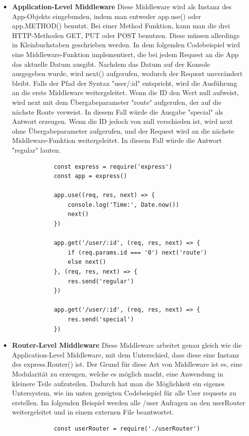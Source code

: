 \begin{itemize}
    \item \textbf{Application-Level Middleware}
        \newline
        Diese Middleware wird als Instanz des App-Objekts eingebunden, indem man entweder app.use() oder app.METHOD() benutzt. Bei einer Method Funktion, kann man die drei HTTP-Methoden GET, PUT oder POST benutzen. Diese müssen allerdings in Kleinbuchstaben geschrieben werden.
        \newline
        In dem folgenden Codebeispiel wird eine Middleware-Funktion implementiert, die bei jedem Request an die App das aktuelle Datum ausgibt. Nachdem das Datum auf der Konsole ausgegeben wurde, wird next() aufgerufen, wodurch der Request unverändert bleibt. Falls der Pfad der Syntax "user/:id" entspricht, wird die Ausführung an die erste Middleware weitergeleitet. Wenn die ID den Wert null aufweist, wird next mit dem Übergabeparameter "route" aufgerufen, der auf die nächste Route verweist. In diesem Fall würde die Ausgabe "special" als Antwort erzeugen. Wenn die ID jedoch von null verschieden ist, wird next ohne Übergabeparameter aufgerufen, und der Request wird an die nächste Middleware-Funktion weitergeleitet. In diesem Fall würde die Antwort "regular" lauten.
        \begin{lstlisting}
            const express = require('express')
            const app = express()

            app.use((req, res, next) => {
                console.log('Time:', Date.now())
                next()
            })
    
            app.get('/user/:id', (req, res, next) => {
                if (req.params.id === '0') next('route')
                else next()
            }, (req, res, next) => {
                res.send('regular')
            })

            app.get('/user/:id', (req, res, next) => {
                res.send('special')
            })
        \end{lstlisting}
    \item \textbf{Router-Level Middleware}
        \newline
        Diese Middleware arbeitet genau gleich wie die Application-Level Middleware, mit dem Unterschied, dass diese eine Instanz des express.Router() ist. Der Grund für diese Art von Middleware ist es, eine Modularität zu erzeugen, welche es möglich macht, eine Anwendung in kleinere Teile aufzuteilen. Dadurch hat man die Möglichkeit ein eigenes Untersystem, wie im unten gezeigten Codebeispiel für alle User requests zu erstellen. Im folgenden Beispiel werden alle /user Anfragen an den userRouter weitergeleitet und in einem externen File beantwortet.
        \begin{lstlisting}
            const userRouter = require('./userRouter')
            

\end{lstlisting}
\end{itemize}
